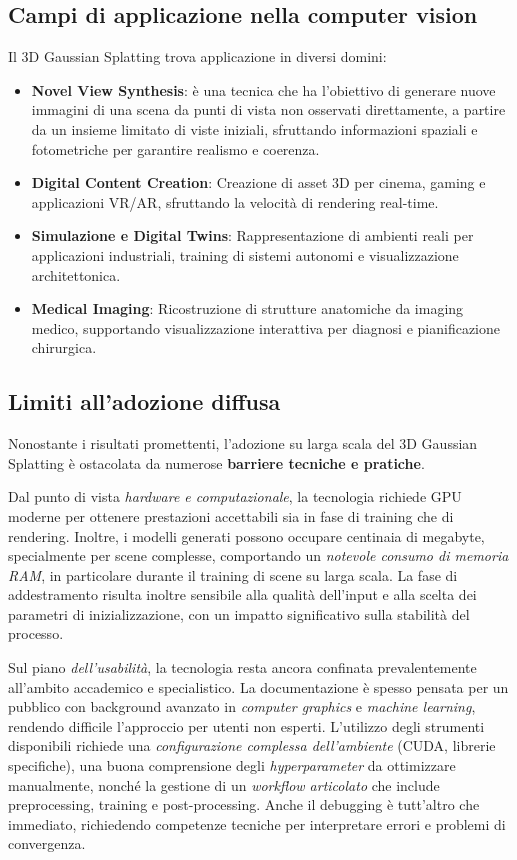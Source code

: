 \subsection{Campi di applicazione nella computer vision}
Il 3D Gaussian Splatting trova applicazione in diversi domini:
\begin{itemize}
	\item \textbf{Novel View Synthesis}: è una tecnica che ha l'obiettivo di generare nuove immagini di una scena da punti di vista non osservati direttamente, a partire da un insieme limitato di viste iniziali, sfruttando informazioni spaziali e fotometriche per garantire realismo e coerenza.
	\item \textbf{Digital Content Creation}: Creazione di asset 3D per cinema, gaming e applicazioni VR/AR, sfruttando la velocità di rendering real-time.
	\item \textbf{Simulazione e Digital Twins}: Rappresentazione di ambienti reali per applicazioni industriali, training di sistemi autonomi e visualizzazione architettonica.
	\item 
	\textbf{Medical Imaging}: Ricostruzione di strutture anatomiche da imaging medico, supportando visualizzazione interattiva per diagnosi e pianificazione chirurgica.
\end{itemize}

\subsection{Limiti all’adozione diffusa}
Nonostante i risultati promettenti, l’adozione su larga scala del 3D Gaussian Splatting è ostacolata da numerose \textbf{barriere tecniche e pratiche}.

Dal punto di vista \textit{hardware e computazionale}, la tecnologia richiede GPU moderne per ottenere prestazioni accettabili sia in fase di training che di rendering. Inoltre, i modelli generati possono occupare centinaia di megabyte, specialmente per scene complesse, comportando un \textit{notevole consumo di memoria RAM}, in particolare durante il training di scene su larga scala. La fase di addestramento risulta inoltre sensibile alla qualità dell’input e alla scelta dei parametri di inizializzazione, con un impatto significativo sulla stabilità del processo.

Sul piano \textit{dell’usabilità}, la tecnologia resta ancora confinata prevalentemente all’ambito accademico e specialistico. La documentazione è spesso pensata per un pubblico con background avanzato in \textit{computer graphics} e \textit{machine learning}, rendendo difficile l’approccio per utenti non esperti. L’utilizzo degli strumenti disponibili richiede una \textit{configurazione complessa dell’ambiente} (CUDA, librerie specifiche), una buona comprensione degli \textit{hyperparameter} da ottimizzare manualmente, nonché la gestione di un \textit{workflow articolato} che include preprocessing, training e post-processing. Anche il debugging è tutt’altro che immediato, richiedendo competenze tecniche per interpretare errori e problemi di convergenza.

